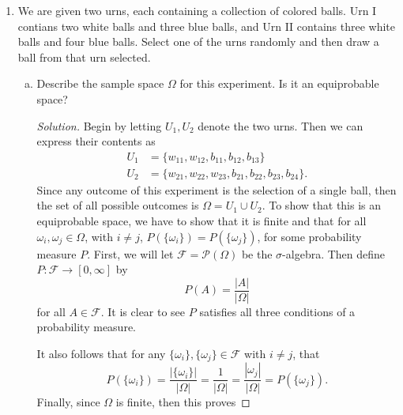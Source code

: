 \documentclass[12pt]{article}
\newenvironment{solution}
{\renewcommand\qedsymbol{$\blacksquare$}\begin{proof}[Solution]}
{\end{proof}}
\begin{document}
\begin{enumerate}
\begin{enumerate}[(a)]
    \end{enumerate} \item We are given two urns, each containing a collection
    of colored balls. Urn I contians two white balls and three blue balls, and
    Urn II contains three white balls and four blue balls. Select one of the
    urns randomly and then draw a ball from that urn selected.
    \begin{enumerate}[(a)] \item Describe the sample space $\Omega$ for this
            experiment.  Is it an equiprobable space?  \begin{solution} Begin
                by letting $U_1, U_2$ denote the two urns. Then we can express
                their contents as \begin{align*} U_1&=\{w_{11}, w_{12}, b_{11},
                    b_{12}, b_{13}\} \\ U_2&=\{w_{21}, w_{22}, w_{23}, b_{21},
                        b_{22}, b_{23}, b_{24}\}.  \end{align*} Since any
                        outcome of this experiment is the selection of a single
                        ball, then the set of all possible outcomes is
                        $\Omega=U_1\cup U_2$. To show that this is an
                        equiprobable space, we have to show that it is finite
                        and that for all $\omega_i, \omega_j\in\Omega$, with
                        $i\neq j$, $P(\{\omega_i\})=P(\{\omega_j\})$, for some
                        probability measure $P$. First, we will let
                        $\mathcal{F}=\mathcal{P}(\Omega)$ be the
                        $\sigma$-algebra. Then define $P:\mathcal{F}\to[0,
                        \infty]$ by \begin{equation*} P(A)=\frac{|A|}{|\Omega|}
                        \end{equation*} for all $A\in\mathcal{F}$. It is clear
                        to see $P$ satisfies all three conditions of
                        a probability measure.\par\hspace{4mm} It also follows
                        that for any $\{\omega_i\}, \{\omega_j\}\in\mathcal{F}$
                        with $i\neq j$, that \begin{equation*}
                            P(\{\omega_i\})=\frac{|\{\omega_i\}|}{|\Omega|}
                            =\frac{1}{|\Omega|}
                    =\frac{|\omega_j|}{|\Omega|}=P(\{\omega_j\}).
            \end{equation*} Finally, since $\Omega$ is finite, then this proves

\end{solution}
\end{enumerate}
\end{enumerate}
\end{document}
